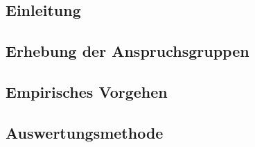 \documentclass[../../main.tex]{subfiles}
\begin{document}
\subsection{Einleitung}


\subsection{Erhebung der Anspruchsgruppen}
\label{erhebung_der_anspruchsgruppen}


\subsection{Empirisches Vorgehen}


\subsection{Auswertungsmethode}
\label{Auswertungsmethode}

\end{document}
